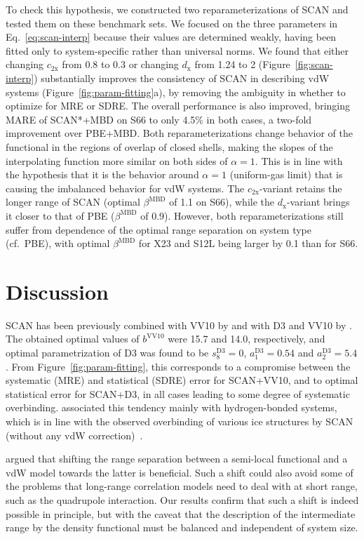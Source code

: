 To check this hypothesis, we constructed two reparameterizations of SCAN and tested them on these benchmark sets.
We focused on the three parameters in Eq.~\ref{eq:scan-interp} because their values are determined weakly, having been fitted only to system-specific rather than universal norms.
We found that either changing $c_\mathrm{2x}$ from 0.8 to 0.3 or changing $d_\mathrm x$ from 1.24 to 2 (Figure~\ref{fig:scan-interp}) substantially improves the consistency of SCAN in describing vdW systems (Figure~\ref{fig:param-fitting}a), by removing the ambiguity in whether to optimize for MRE or SDRE\@.
The overall performance is also improved, bringing MARE of SCAN*+MBD on S66 to only 4.5\% in both cases, a two-fold improvement over PBE+MBD\@.
Both reparameterizations change behavior of the functional in the regions of overlap of closed shells, making the slopes of the interpolating function more similar on both sides of $\alpha=1$.
This is in line with the hypothesis that it is the behavior around $\alpha=1$ (uniform-gas limit) that is causing the imbalanced behavior for vdW systems.
The $c_\mathrm{2x}$-variant retains the longer range of SCAN (optimal $\beta^\text{MBD}$ of 1.1 on S66), while the $d_\mathrm x$-variant brings it closer to that of PBE ($\beta^\text{MBD}$ of 0.9).
However, both reparameterizations still suffer from dependence of the optimal range separation on system type (cf.\ PBE), with optimal $\beta^\text{MBD}$ for X23 and S12L being larger by 0.1 than for S66.

\section{Discussion}

SCAN has been previously combined with VV10 by \citet{PengPRX16} and with D3 and VV10 by \citet{BrandenburgPRB16}.
The obtained optimal values of $b^\text{VV10}$ were 15.7 and 14.0, respectively, and optimal parametrization of D3 was found to be $s_8^\text{D3}=0$, $a_1^\text{D3}=0.54$ and $a_2^\text{D3}=5.4$.
From Figure~\ref{fig:param-fitting}, this corresponds to a compromise between the systematic (MRE) and statistical (SDRE) error for SCAN+VV10, and to optimal statistical error for SCAN+D3, in all cases leading to some degree of systematic overbinding.
\citet{BrandenburgPRB16} associated this tendency mainly with hydrogen-bonded systems, which is in line with the observed overbinding of various ice structures by SCAN (without any vdW correction)~\cite{ChenPRB16}.

\citet{PengPRX16} argued that shifting the range separation between a semi-local functional and a vdW model towards the latter is beneficial.
Such a shift could also avoid some of the problems that long-range correlation models need to deal with at short range, such as the quadrupole interaction.
Our results confirm that such a shift is indeed possible in principle, but with the caveat that the description of the intermediate range by the density functional must be balanced and independent of system size.

